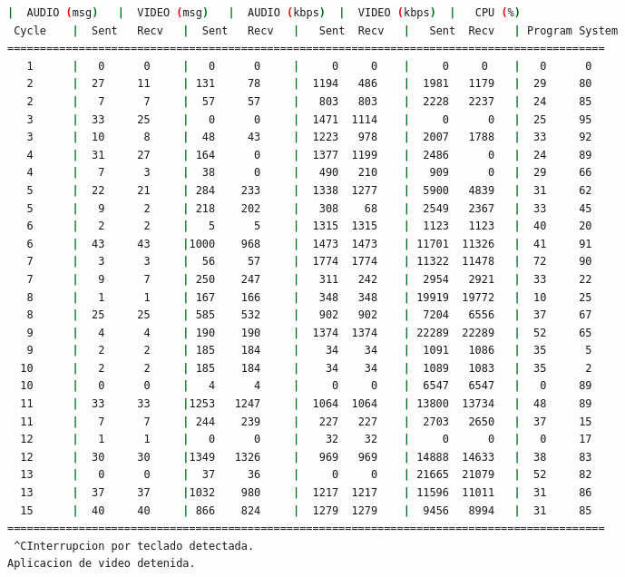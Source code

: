 \begin{adjustbox}{max width=\textwidth}
\begin{lstlisting}[language=bash,basicstyle=\ttfamily\scriptsize]
          |  AUDIO (msg)   |  VIDEO (msg)   |  AUDIO (kbps)  |  VIDEO (kbps)  |   CPU (%)
 Cycle    |  Sent   Recv   |  Sent   Recv   |   Sent  Recv   |   Sent  Recv   | Program System
============================================================================================
   1      |   0      0     |   0      0     |     0     0    |     0     0    |   0      0
   2      |  27     11     | 131     78     |  1194   486    |  1981   1179   |  29     80
   2      |   7      7     |  57     57     |   803   803    |  2228   2237   |  24     85
   3      |  33     25     |   0      0     |  1471  1114    |     0      0   |  25     95
   3      |  10      8     |  48     43     |  1223   978    |  2007   1788   |  33     92
   4      |  31     27     | 164      0     |  1377  1199    |  2486      0   |  24     89
   4      |   7      3     |  38      0     |   490   210    |   909      0   |  29     66
   5      |  22     21     | 284    233     |  1338  1277    |  5900   4839   |  31     62
   5      |   9      2     | 218    202     |   308    68    |  2549   2367   |  33     45
   6      |   2      2     |   5      5     |  1315  1315    |  1123   1123   |  40     20
   6      |  43     43     |1000    968     |  1473  1473    | 11701  11326   |  41     91
   7      |   3      3     |  56     57     |  1774  1774    | 11322  11478   |  72     90
   7      |   9      7     | 250    247     |   311   242    |  2954   2921   |  33     22
   8      |   1      1     | 167    166     |   348   348    | 19919  19772   |  10     25
   8      |  25     25     | 585    532     |   902   902    |  7204   6556   |  37     67
   9      |   4      4     | 190    190     |  1374  1374    | 22289  22289   |  52     65
   9      |   2      2     | 185    184     |    34    34    |  1091   1086   |  35      5
  10      |   2      2     | 185    184     |    34    34    |  1089   1083   |  35      2
  10      |   0      0     |   4      4     |     0     0    |  6547   6547   |   0     89
  11      |  33     33     |1253   1247     |  1064  1064    | 13800  13734   |  48     89
  11      |   7      7     | 244    239     |   227   227    |  2703   2650   |  37     15
  12      |   1      1     |   0      0     |    32    32    |     0      0   |   0     17
  12      |  30     30     |1349   1326     |   969   969    | 14888  14633   |  38     83
  13      |   0      0     |  37     36     |     0     0    | 21665  21079   |  52     82
  13      |  37     37     |1032    980     |  1217  1217    | 11596  11011   |  31     86
  15      |  40     40     | 866    824     |  1279  1279    |  9456   8994   |  31     85
============================================================================================
 ^CInterrupcion por teclado detectada.
Aplicacion de video detenida.


\end{lstlisting}
\end{adjustbox}

